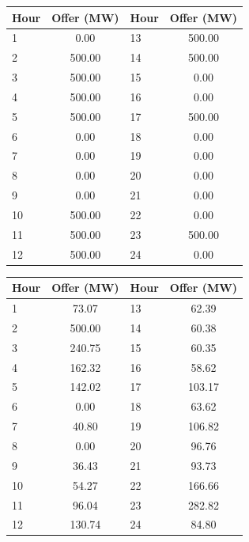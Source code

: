 \begin{minipage}{0.48\linewidth}
\centering
{}
\begin{tabular}{lclc}
\toprule
Hour & Offer (MW) & Hour & Offer (MW) \\
\midrule
1  & 0.00   & 13 & 500.00 \\
2  & 500.00 & 14 & 500.00 \\
3  & 500.00 & 15 & 0.00 \\
4  & 500.00 & 16 & 0.00 \\
5  & 500.00 & 17 & 500.00 \\
6  & 0.00   & 18 & 0.00 \\
7  & 0.00   & 19 & 0.00 \\
8  & 0.00   & 20 & 0.00 \\
9  & 0.00   & 21 & 0.00 \\
10 & 500.00 & 22 & 0.00 \\
11 & 500.00 & 23 & 500.00 \\
12 & 500.00 & 24 & 0.00 \\
\bottomrule
\end{tabular}
\end{minipage}
\hfill
\begin{minipage}{0.48\linewidth}
\centering
{}
\begin{tabular}{lclc}
\toprule
Hour & Offer (MW) & Hour & Offer (MW) \\
\midrule
1  & 73.07  & 13 & 62.39 \\
2  & 500.00 & 14 & 60.38 \\
3  & 240.75 & 15 & 60.35 \\
4  & 162.32 & 16 & 58.62 \\
5  & 142.02 & 17 & 103.17 \\
6  & 0.00   & 18 & 63.62 \\
7  & 40.80  & 19 & 106.82 \\
8  & 0.00   & 20 & 96.76 \\
9  & 36.43  & 21 & 93.73 \\
10 & 54.27  & 22 & 166.66 \\
11 & 96.04  & 23 & 282.82 \\
12 & 130.74 & 24 & 84.80 \\
\bottomrule
\end{tabular}
\end{minipage}
